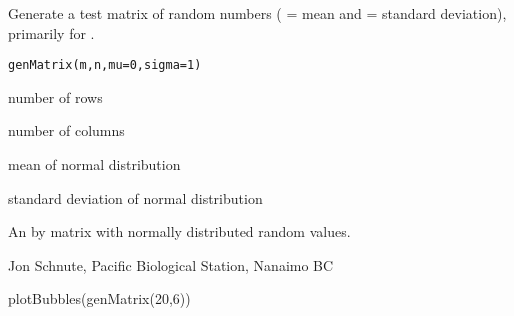 \documentclass[letterpaper]{book}
\begin{document}
\begin{Description}\relax
Generate a test matrix of random numbers ( = mean 
and  = standard deviation), primarily for .
\end{Description}
\begin{Usage}
\begin{verbatim}
genMatrix(m,n,mu=0,sigma=1)
\end{verbatim}
\end{Usage}
\begin{Arguments}
\begin{ldescription}
\item[\code{m}] number of rows
\item[\code{n}] number of columns
\item[\code{mu}] mean of normal distribution
\item[\code{sigma}] standard deviation of normal distribution
\end{ldescription}
\end{Arguments}
\begin{Value}
An  by  matrix with normally distributed random values.
\end{Value}
\begin{Author}\relax
Jon Schnute, Pacific Biological Station, Nanaimo BC
\end{Author}
\begin{SeeAlso}\relax
{}
\end{SeeAlso}
\begin{Examples}
\begin{ExampleCode} plotBubbles(genMatrix(20,6)) \end{ExampleCode}
\end{Examples}
\end{document}
